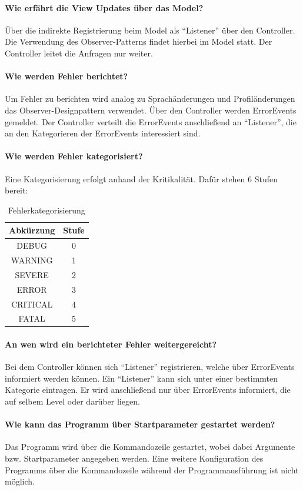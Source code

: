   \paragraph{Wie erfährt die View Updates über das Model?}
  Über die indirekte Registrierung beim Model als "`Listener"' über den Controller. Die Verwendung des Observer-Patterns findet hierbei im Model statt. Der Controller
  leitet die Anfragen nur weiter.
  \paragraph{Wie werden Fehler berichtet?}
  Um Fehler zu berichten wird analog zu Sprachänderungen und Profiländerungen das Observer-Designpattern verwendet. Über den Controller werden ErrorEvents gemeldet.
  Der Controller verteilt die ErrorEvents anschließend an "`Listener"', die an den Kategorieren der ErrorEvents interessiert sind.
  \paragraph{Wie werden Fehler kategorisiert?}
  Eine Kategorisierung erfolgt anhand der Kritikalität. Dafür stehen 6 Stufen bereit:
  \begin{table}[H]
    \label{tap:cat}
    \caption{Fehlerkategorisierung}
    \center
    \begin{tabular}{|c|c|}
    \hline
    \textbf{Abkürzung} & \textbf{Stufe}\\
    \hline
    DEBUG & 0\\
    \hline
    WARNING & 1\\
    \hline
    SEVERE & 2\\
    \hline
    ERROR & 3\\
    \hline
    CRITICAL & 4\\
    \hline
   	FATAL & 5\\
    \hline
    \end{tabular}
  \end{table}

  \paragraph{An wen wird ein berichteter Fehler weitergereicht?}
  Bei dem Controller können sich "`Listener"' registrieren, welche über ErrorEvents informiert werden können.
  Ein "`Listener"' kann sich unter einer bestimmten Kategorie eintragen. Er wird anschließend nur über ErrorEvents informiert, die auf selbem Level oder darüber liegen.
  \paragraph{Wie kann das Programm über Startparameter gestartet werden?}
  Das Programm wird über die Kommandozeile gestartet, wobei dabei Argumente bzw. Startparameter angegeben werden. Eine weitere Konfiguration
  des Programms über die Kommandozeile während der Programmausführung ist nicht möglich.
